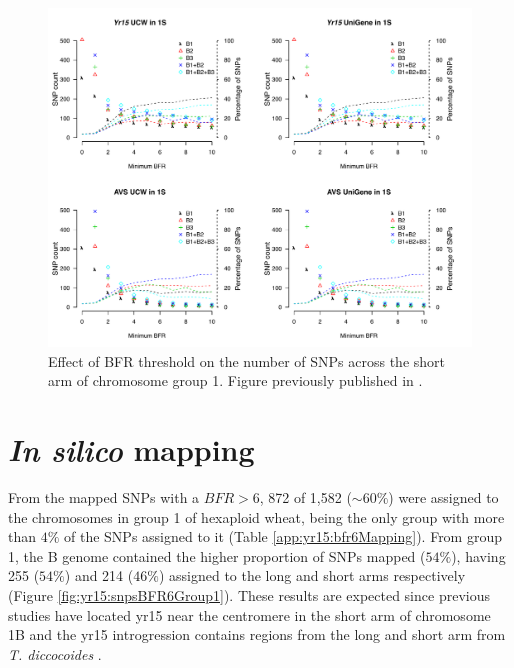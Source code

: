 \begin{figure}
\includegraphics[width=1\textwidth]{Yr15/Figures/bfrChanges.pdf}
\caption[Effect of BFR threshold on the number of SNPs]{Effect of BFR threshold on the number of SNPs across the short arm of chromosome group 1. Figure previously published in \citet{Ramirez-Gonzalez2015b}. }
\label{fig:yr15:bfrChange}
\end{figure}

\section{\textit{In silico} mapping}
\label{sub:yr15:inSilico}
From the mapped SNPs with a $BFR>6$, 872 of 1,582 ($\sim60\%$) were assigned to the chromosomes in group 1 of hexaploid wheat, being the only group with more than $4\%$ of the SNPs assigned to it (Table \ref{app:yr15:bfr6Mapping}). 
From group 1, the B genome contained the higher proportion of SNPs mapped ($54\%$), having 255 ($54\%$) and 214 ($46\%$) assigned to the long and short arms respectively (Figure \ref{fig:yr15:snpsBFR6Group1}).  
These results are expected since previous studies have located \acrshort{yr15} near the centromere in the short arm of chromosome 1B and the \acrshort{yr15} introgression contains regions from the long and short arm from \textit{T. diccocoides} \citep{Murphy2009,Peng2000,Grama1997}. 

